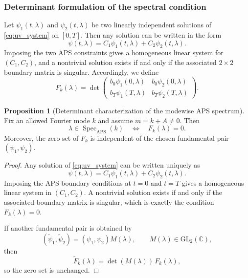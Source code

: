 \documentclass[11pt]{article}
\theoremstyle{definition}
\newtheorem{proposition}[theorem]{Proposition}
\DeclareMathOperator{\Spec}{Spec}
\numberwithin{equation}{section}
\begin{document}
\subsubsection{Determinant formulation of the spectral condition}\label{subsec:determinant-spectrum}
Let \(\psi_1(t,\lambda)\) and \(\psi_2(t,\lambda)\) be two linearly independent solutions of
\eqref{eq:uv_system} on \([0,T]\). Then any solution can be written in the form
\begin{equation}
\psi(t,\lambda)=C_1\psi_1(t,\lambda)+C_2\psi_2(t,\lambda).
\end{equation}
Imposing the two APS constraints gives a homogeneous linear system for \((C_1,C_2)\), and a nontrivial solution exists if and only if the associated \(2\times 2\) boundary matrix is singular. Accordingly, we define
\begin{equation}\label{eq:Fk-def}
F_k(\lambda)=\det\begin{pmatrix}
b_0\psi_1(0,\lambda) & b_0\psi_2(0,\lambda)\\
b_T\psi_1(T,\lambda) & b_T\psi_2(T,\lambda)
\end{pmatrix}.
\end{equation}

\begin{proposition}[Determinant characterization of the modewise APS spectrum]
Fix an allowed Fourier mode \(k\) and assume \(m=k+A\neq 0\). Then
\begin{equation}
\lambda\in\Spec_{\mathrm{APS}}(k)
\quad\Longleftrightarrow\quad
F_k(\lambda)=0.
\end{equation}
Moreover, the zero set of \(F_k\) is independent of the chosen fundamental pair
\((\psi_1,\psi_2)\).
\end{proposition}

\begin{proof}
Any solution of \eqref{eq:uv_system} can be written uniquely as
\begin{equation}
\psi(t,\lambda)=C_1\psi_1(t,\lambda)+C_2\psi_2(t,\lambda).
\end{equation}
Imposing the APS boundary conditions at \(t=0\) and \(t=T\) gives a homogeneous linear system in \((C_1,C_2)\). A nontrivial solution exists if and only if the associated boundary matrix is singular, which is exactly the condition \(F_k(\lambda)=0\).

If another fundamental pair is obtained by
\begin{equation}
(\widetilde\psi_1,\widetilde\psi_2)=(\psi_1,\psi_2)M(\lambda),
\qquad
M(\lambda)\in\mathrm{GL}_2(\mathbb C),
\end{equation}
then
\begin{equation}
\widetilde F_k(\lambda)=\det(M(\lambda))\,F_k(\lambda),
\end{equation}
so the zero set is unchanged.
\end{proof}
\end{document}
